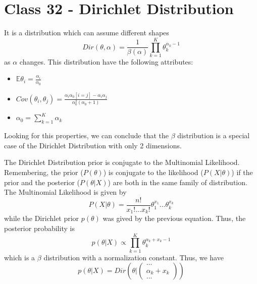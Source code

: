 \documentclass{article}
\begin{document}
\section{Class 32 - Dirichlet Distribution}
It is a distribution which can assume different shapes
\begin{equation}
    Dir(\theta, \alpha) = \frac{1}{\beta(\alpha)} \prod_{k=1}^K \theta_k^{\alpha_k-1}
\end{equation}
as $\alpha$ changes. This distribution have the following attributes:
\begin{itemize}
    \item $\mathbb{E} \theta_i = \frac{\alpha_i}{\alpha_0}$
    \item $Cov(\theta_i, \theta_j) = \frac{\alpha_i\alpha_0[i = j]-\alpha_i\alpha_j}{\alpha_0 ^2 (\alpha_0 +1)}$
    \item $\alpha_0 = \sum_{k=1}^K \alpha_k$
\end{itemize}
Looking for this properties, we can conclude that the $\beta$ distribution is a special case of the Dirichlet Distribution with only 2 dimensions.

The Dirichlet Distribution prior is conjugate to the Multinomial Likelihood. Remembering, the prior ($P(\theta)$) is conjugate to the likelihood ($P(X|\theta)$) if the prior and the posterior ($P(\theta|X)$) are both in the same family of distribution. The Multinomial Likelihood is given by
\begin{equation}
    P(X|\theta) = \frac{n!}{x_1!...x_k!}\theta_1^{x_1}...\theta_k^{x_k}
\end{equation}
while the Dirichlet prior $p(\theta)$ was gived by the previous equation. Thus, the posterior probability is
\begin{equation}
    p(\theta|X) \propto \prod_{k=1}^K \theta_k^{\alpha_k + x_k -1}
\end{equation}
which is a $\beta$ distribution with a normalization constant. Thus, we have
\begin{equation}
    p(\theta|X) = Dir\left(\theta| \begin{pmatrix}
            ...\\
            \alpha_k + x_k\\
            ...
        \end{pmatrix}
    \right)
\end{equation}
\end{document}
